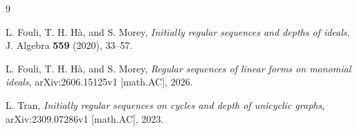 \documentclass[11pt]{amsart}
\theoremstyle{remark}
\begin{document}
\begin{thebibliography}{9}

L. Fouli, T. H. H\`a, and S. Morey,
\emph{Initially regular sequences and depths of ideals},
J. Algebra \textbf{559} (2020), 33--57.

L. Fouli, T. H. H\`a, and S. Morey,
\emph{Regular sequences of linear forms on monomial ideals},
arXiv:2606.15125v1 [math.AC], 2026.

L. Tran,
\emph{Initially regular sequences on cycles and depth of unicyclic graphs},
arXiv:2309.07286v1 [math.AC], 2023.

\end{thebibliography}
\end{document}
